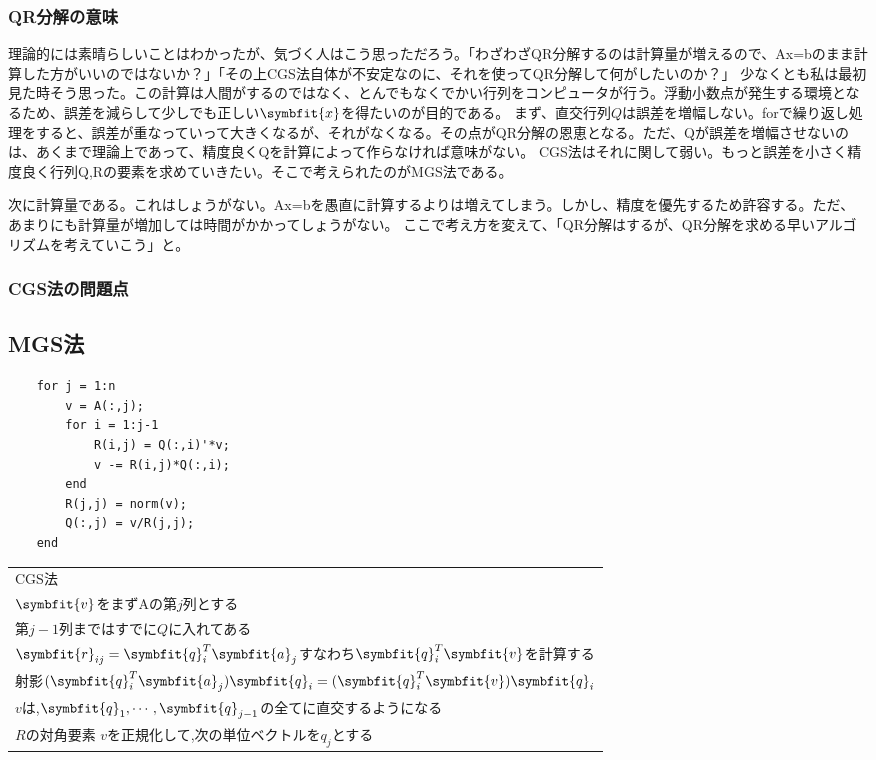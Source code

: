 \subsubsection{QR分解の意味}
理論的には素晴らしいことはわかったが、気づく人はこう思っただろう。「わざわざQR分解するのは計算量が増えるので、Ax=bのまま計算した方がいいのではないか？」「その上CGS法自体が不安定なのに、それを使ってQR分解して何がしたいのか？」
少なくとも私は最初見た時そう思った。この計算は人間がするのではなく、とんでもなくでかい行列をコンピュータが行う。浮動小数点が発生する環境となるため、誤差を減らして少しでも正しい$\symbfit{x}$を得たいのが目的である。
まず、直交行列$Q$は誤差を増幅しない。forで繰り返し処理をすると、誤差が重なっていって大きくなるが、それがなくなる。その点がQR分解の恩恵となる。ただ、Qが誤差を増幅させないのは、あくまで理論上であって、精度良くQを計算によって作らなければ意味がない。
CGS法はそれに関して弱い。もっと誤差を小さく精度良く行列Q,Rの要素を求めていきたい。そこで考えられたのがMGS法である。

次に計算量である。これはしょうがない。Ax=bを愚直に計算するよりは増えてしまう。しかし、精度を優先するため許容する。ただ、あまりにも計算量が増加しては時間がかかってしょうがない。
ここで考え方を変えて、「QR分解はするが、QR分解を求める早いアルゴリズムを考えていこう」と。
\subsubsection{CGS法の問題点}

\subsection{MGS法}
\begin{tcolorbox}[colframe=black!80,colback=white,title=MGS法のプログラム的処理方法]
\begin{minipage}[t]{0.4\textwidth}
\begin{verbatim}
    for j = 1:n
        v = A(:,j);
        for i = 1:j-1
            R(i,j) = Q(:,i)'*v;
            v -= R(i,j)*Q(:,i);
        end
        R(j,j) = norm(v);
        Q(:,j) = v/R(j,j);
    end       
\end{verbatim}
\end{minipage}\hfill
\begin{minipage}[t]{0.6\textwidth}
    \bigskip
    \begin{tabular}[H]{|l}
        CGS法 \\
        $\symbfit{v}$をまずAの第$j$列とする \\
        第$j-1$列まではすでに$Q$に入れてある\\
        $\symbfit{r}_{ij}=\symbfit{q}_i^T\symbfit{a}_j$すなわち$\symbfit{q}_i^T\symbfit{v}$を計算する\\
        射影$(\symbfit{q}_i^T\symbfit{a}_j)\symbfit{q}_i=(\symbfit{q}_i^T\symbfit{v})\symbfit{q}_i$\\
        $v$は,$\symbfit{q}_1,\cdots,\symbfit{q}_{j-1}$の全てに直交するようになる\\
        $R$の対角要素
        $v$を正規化して,次の単位ベクトルを$q_j$とする
    \end{tabular}
    \bigskip
\end{minipage}
\end{tcolorbox}
\noindent

